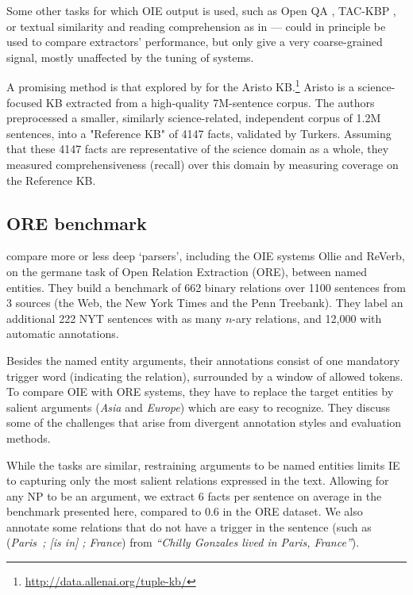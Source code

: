 \pdfoutput=1 \documentclass[11pt, a4paper]{article}
\begin{document}
Some other tasks for which OIE output is used, such as Open QA
\cite{Fader:2014:OQA:2623330.2623677}, TAC-KBP
\cite{DBLP:conf/tac/SoderlandGBEW13}, or textual similarity and reading
comprehension as in \cite{stanovsky-dagan:2015:ACL-IJCNLP} --- could in
principle be used to compare extractors' performance, but only give a very
coarse-grained signal, mostly unaffected by the tuning of systems.

A promising method is that explored by \citet{DBLP:journals/tacl/MishraTC17}
for the Aristo KB.\footnote{\url{http://data.allenai.org/tuple-kb/}} Aristo is a
science-focused KB extracted from a high-quality 7M-sentence corpus. The
authors preprocessed a smaller, similarly science-related, independent
corpus of 1.2M sentences, into a "Reference KB" of 4147 facts, validated by
Turkers. Assuming that these 4147 facts are representative of the science
domain as a whole, they measured comprehensiveness (recall) over this domain
by measuring coverage on the Reference KB.

\subsection{ORE benchmark}
\label{sec:orgea721fe}

\citet{mesquita-schmidek-barbosa:2013:EMNLP} compare more or less deep
`parsers', including the OIE systems Ollie and ReVerb, on the germane task
of Open Relation Extraction (ORE), between named entities. They build a benchmark
of 662 binary relations over 1100 sentences from 3 sources (the Web, the
New York Times and the Penn Treebank). They label an additional 222 NYT
sentences with as many $n$-ary relations, and 12,000 with
automatic annotations. 

Besides the named entity arguments, their annotations consist of one
mandatory trigger word (indicating the relation), surrounded by a window of
allowed tokens. To compare OIE with ORE systems, they have to replace the
target entities by salient arguments (\emph{Asia} and \emph{Europe}) which are easy
to recognize. They discuss some of the challenges that arise from divergent
annotation styles and evaluation methods.

While the tasks are similar, restraining arguments to be named entities
limits IE to capturing only the most salient relations expressed in the
text. Allowing for any NP to be an argument, we extract 6 facts per
sentence on average in the benchmark presented here, compared to 0.6 in
the ORE dataset. We also annotate some relations that do not have a trigger
in the sentence (such as (\emph{Paris~; [is in] ; France}) from \emph{``Chilly Gonzales
lived in Paris, France''}).
\end{document}
